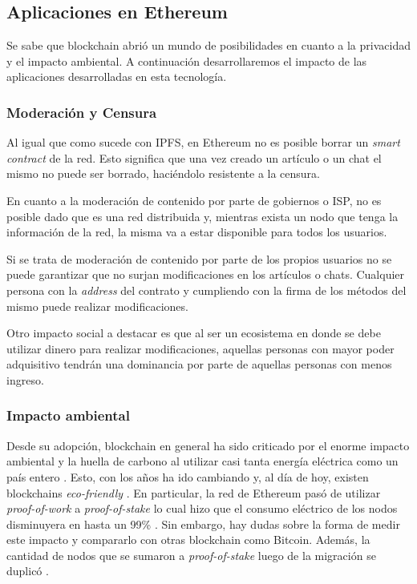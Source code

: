 \subsection{Aplicaciones en Ethereum}

Se sabe que blockchain abrió un mundo de posibilidades en cuanto a la privacidad y el impacto ambiental. A continuación desarrollaremos el impacto de las aplicaciones desarrolladas en esta tecnología.

\subsubsection{Moderación y Censura}

Al igual que como sucede con IPFS, en Ethereum no es posible borrar un \textit{smart contract} de la red. Esto significa que una vez creado un artículo o un chat el mismo no puede ser borrado, haciéndolo resistente a la censura.

En cuanto a la moderación de contenido por parte de gobiernos o ISP, no es posible dado que es una red distribuida y, mientras exista un nodo que tenga la información de la red, la misma va a estar disponible para todos los usuarios.

Si se trata de moderación de contenido por parte de los propios usuarios no se puede garantizar que no surjan modificaciones en los artículos o chats. Cualquier persona con la \textit{address} del contrato y cumpliendo con la firma de los métodos del mismo puede realizar modificaciones.

Otro impacto social a destacar es que al ser un ecosistema en donde se debe utilizar dinero para realizar modificaciones, aquellas personas con mayor poder adquisitivo tendrán una dominancia por parte de aquellas personas con menos ingreso.

\subsubsection{Impacto ambiental}

Desde su adopción, blockchain en general ha sido criticado por el enorme impacto ambiental y la huella de carbono al utilizar casi tanta energía eléctrica como un país entero \cite{ethereum-honduras}. Esto, con los años ha ido cambiando y, al día de hoy, existen blockchains \textit{eco-friendly} \cite{blockchain-eco-friendly}. En particular, la red de Ethereum pasó de utilizar \textit{proof-of-work} a \textit{proof-of-stake} lo cual hizo que el consumo eléctrico de los nodos disminuyera en hasta un 99\% \cite{ethereum-green}. Sin embargo, hay dudas sobre la forma de medir este impacto y compararlo con otras blockchain como Bitcoin. Además, la cantidad de nodos que se sumaron a \textit{proof-of-stake} luego de la migración se duplicó \cite{ethereum-pos}.
